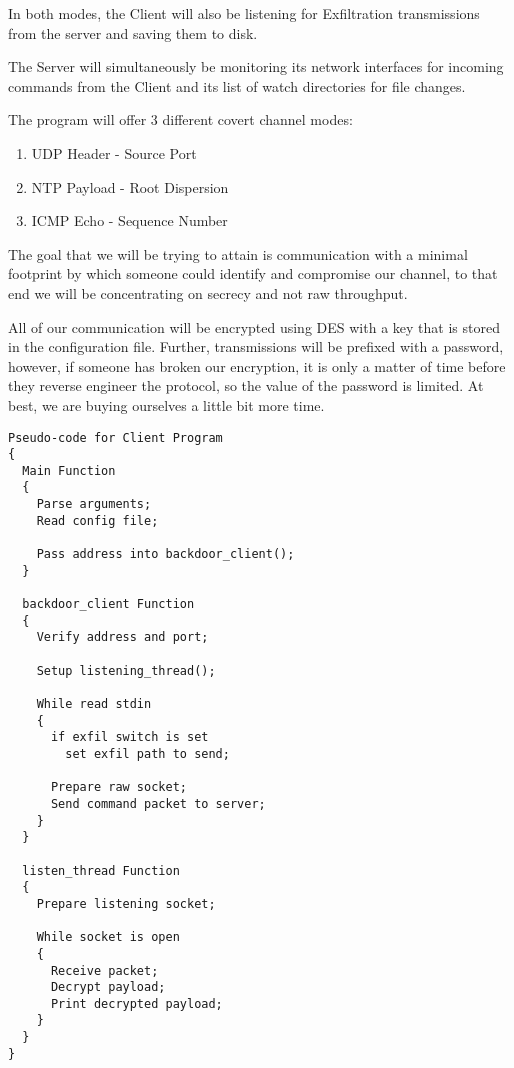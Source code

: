 \documentclass[titlepage]{article}
\begin{document}
In both modes, the Client will also be listening for Exfiltration transmissions from the server and saving them to disk.

The Server will simultaneously be monitoring its network interfaces for incoming commands from the Client and its list of
watch directories for file changes.

The program will offer 3 different covert channel modes:
\begin{enumerate}
  \item UDP Header - Source Port
  \item NTP Payload - Root Dispersion
  \item ICMP Echo - Sequence Number
\end{enumerate}

The goal that we will be trying to attain is communication with a minimal footprint by which someone could identify and compromise our channel, to
that end we will be concentrating on secrecy and not raw throughput.

All of our communication will be encrypted using DES with a key that is stored in the configuration file.  Further, transmissions will be prefixed with a password,
however, if someone has broken our encryption, it is only a matter of time before they reverse engineer the protocol, so the value of the password is limited.
At best, we are buying ourselves a little bit more time.\\

\begin{lstlisting}
Pseudo-code for Client Program
{
  Main Function
  {
    Parse arguments;
    Read config file;

    Pass address into backdoor_client();
  }

  backdoor_client Function
  {
    Verify address and port;

    Setup listening_thread();

    While read stdin
    {
      if exfil switch is set
        set exfil path to send;

      Prepare raw socket;
      Send command packet to server;
    }
  }

  listen_thread Function
  {
    Prepare listening socket;

    While socket is open
    {
      Receive packet;
      Decrypt payload;
      Print decrypted payload;
    }
  }
}
\end{lstlisting}

\clearpage
\end{document}
